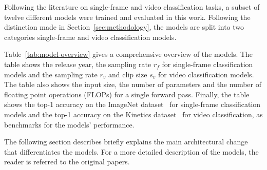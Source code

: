 \documentclass[a4paper]{article}
\begin{document}
Following the literature on single-frame and video classification tasks, a
subset of twelve different models were trained and evaluated in this work.
Following the distinction made in Section~\ref{sec:methodology}, the models are
split into two categories single-frame and video classification models. 

Table~\ref{tab:model-overview} gives a comprehensive overview of the models. The
table shows the release year, the sampling rate $r_f$ for single-frame
classification models and the sampling rate $r_v$ and clip size $s_v$ for video
classification models. The table also shows the input size, the number of
parameters and the number of floating point operations (FLOPs) for a single
forward pass. Finally, the table shows the top-1 accuracy on the ImageNet
dataset~\cite{imagenet} for single-frame classification models and the top-1
accuracy on the Kinetics dataset~\cite{kinetics} for video classification, as
benchmarks for the models' performance.

The following section describes briefly explains the main architectural change
that differentiates the models. For a more detailed description of the models,
the reader is referred to the original papers.

\end{document}
